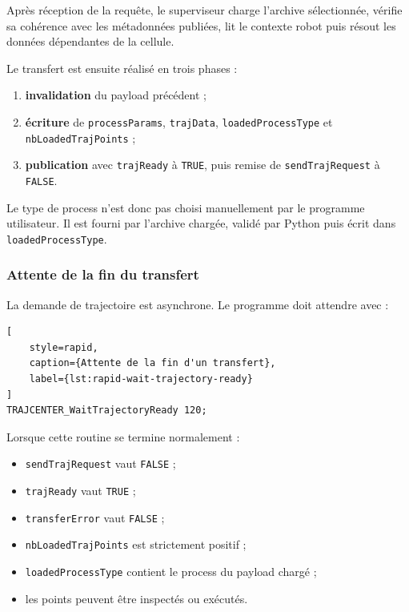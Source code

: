 \documentclass{rapportENSAM}
\begin{document}
Après réception de la requête, le superviseur charge l'archive sélectionnée,
vérifie sa cohérence avec les métadonnées publiées, lit le contexte robot puis
résout les données dépendantes de la cellule.

Le transfert est ensuite réalisé en trois phases :

\begin{enumerate}
    \item \textbf{invalidation} du payload précédent ;
    \item \textbf{écriture} de \texttt{processParams}, \texttt{trajData},
    \texttt{loadedProcessType} et \texttt{nbLoadedTrajPoints} ;
    \item \textbf{publication} avec \texttt{trajReady} à \texttt{TRUE}, puis
    remise de \texttt{sendTrajRequest} à \texttt{FALSE}.
\end{enumerate}

Le type de process n'est donc pas choisi manuellement par le programme
utilisateur. Il est fourni par l'archive chargée, validé par Python puis écrit
dans \texttt{loadedProcessType}.


\subsubsection{Attente de la fin du transfert}
\label{subsubsec:rapid-synchronization}

La demande de trajectoire est asynchrone. Le programme doit attendre avec :

\begin{lstlisting}[
    style=rapid,
    caption={Attente de la fin d'un transfert},
    label={lst:rapid-wait-trajectory-ready}
]
TRAJCENTER_WaitTrajectoryReady 120;
\end{lstlisting}

Lorsque cette routine se termine normalement :

\begin{itemize}
    \item \texttt{sendTrajRequest} vaut \texttt{FALSE} ;
    \item \texttt{trajReady} vaut \texttt{TRUE} ;
    \item \texttt{transferError} vaut \texttt{FALSE} ;
    \item \texttt{nbLoadedTrajPoints} est strictement positif ;
    \item \texttt{loadedProcessType} contient le process du payload chargé ;
    \item les points peuvent être inspectés ou exécutés.
\end{itemize}
\end{document}
